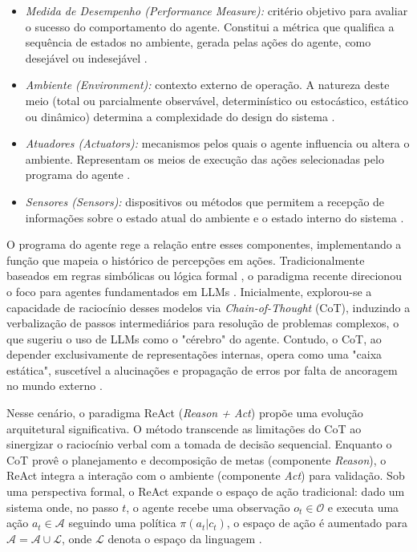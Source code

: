 \documentclass[
	12pt,				%
	openright,			%
	oneside,			%
	a4paper,			%
	dissertacao,			%
	]{ABNT-DC-UEL}
\begin{document}
\begin{itemize}
  \item \textit{Medida de Desempenho (Performance Measure):} critério objetivo para avaliar o sucesso do comportamento do agente. Constitui a métrica que qualifica a sequência de estados no ambiente, gerada pelas ações do agente, como desejável ou indesejável \cite{russel2020}.
  \item \textit{Ambiente (Environment):} contexto externo de operação. A natureza deste meio (total ou parcialmente observável, determinístico ou estocástico, estático ou dinâmico) determina a complexidade do design do sistema \cite{russel2020}.
  \item \textit{Atuadores (Actuators):} mecanismos pelos quais o agente influencia ou altera o ambiente. Representam os meios de execução das ações selecionadas pelo programa do agente \cite{russel2020}.
  \item \textit{Sensores (Sensors):} dispositivos ou métodos que permitem a recepção de informações sobre o estado atual do ambiente e o estado interno do sistema \cite{russel2020}.
\end{itemize}

O programa do agente rege a relação entre esses componentes, implementando a função que mapeia o histórico de percepções em ações. Tradicionalmente baseados em regras simbólicas ou lógica formal \cite{russel2020}, o paradigma recente direcionou o foco para agentes fundamentados em LLMs \cite{kong2024, yao2023}. Inicialmente, explorou-se a capacidade de raciocínio desses modelos via \textit{Chain-of-Thought} (CoT), induzindo a verbalização de passos intermediários para resolução de problemas complexos, o que sugeriu o uso de LLMs como o "cérebro" do agente. Contudo, o CoT, ao depender exclusivamente de representações internas, opera como uma "caixa estática", suscetível a alucinações e propagação de erros por falta de ancoragem no mundo externo \cite{wei2022cot}.

Nesse cenário, o paradigma ReAct (\textit{Reason + Act}) propõe uma evolução arquitetural significativa. O método transcende as limitações do CoT ao sinergizar o raciocínio verbal com a tomada de decisão sequencial. Enquanto o CoT provê o planejamento e decomposição de metas (componente \textit{Reason}), o ReAct integra a interação com o ambiente (componente \textit{Act}) para validação. Sob uma perspectiva formal, o ReAct expande o espaço de ação tradicional: dado um sistema onde, no passo $t$, o agente recebe uma observação $o_{t} \in \mathcal{O}$ e executa uma ação $a_{t} \in \mathcal{A}$ seguindo uma política $\pi(a_{t}|c_{t})$, o espaço de ação é aumentado para $\hat{\mathcal{A}} = \mathcal{A} \cup \mathcal{L}$, onde $\mathcal{L}$ denota o espaço da linguagem \cite{yao2023}.
\end{document}
